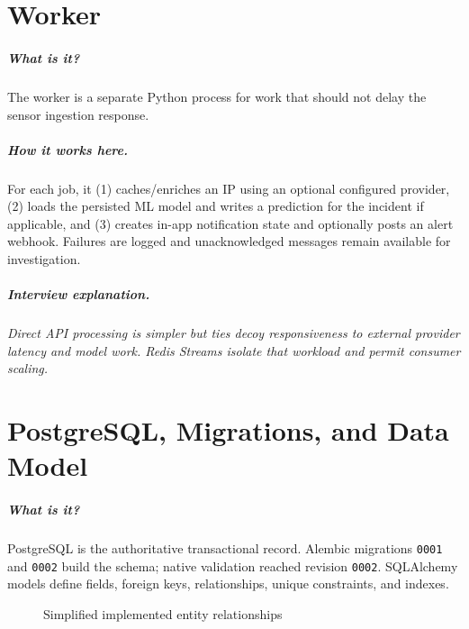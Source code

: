 \documentclass[11pt,oneside]{book}
\newcommand{\what}[1]{\paragraph{What is it?}#1}
\newcommand{\how}[1]{\paragraph{How it works here.}#1}
\newcommand{\interview}[1]{\paragraph{Interview explanation.}\emph{#1}}
\begin{document}
\chapter{Worker}
\what{The worker is a separate Python process for work that should not delay the sensor ingestion response.}\how{For each job, it (1) caches/enriches an IP using an optional configured provider, (2) loads the persisted ML model and writes a prediction for the incident if applicable, and (3) creates in-app notification state and optionally posts an alert webhook. Failures are logged and unacknowledged messages remain available for investigation.}
\interview{Direct API processing is simpler but ties decoy responsiveness to external provider latency and model work. Redis Streams isolate that workload and permit consumer scaling.}

\chapter{PostgreSQL, Migrations, and Data Model}
\what{PostgreSQL is the authoritative transactional record. Alembic migrations \texttt{0001} and \texttt{0002} build the schema; native validation reached revision \texttt{0002}. SQLAlchemy models define fields, foreign keys, relationships, unique constraints, and indexes.}
\begin{figure}[h]\centering{}\caption{Simplified implemented entity relationships}\end{figure}
\end{document}
